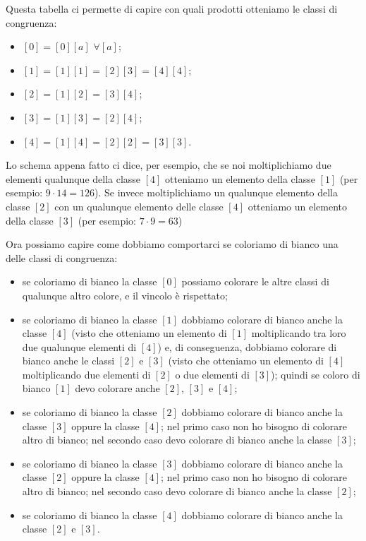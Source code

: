 \begin{soluzione}
    Questa tabella ci permette di capire con quali prodotti otteniamo le classi di congruenza:
    \begin{itemize}
        \item $[0] = [0][a] \,\,\forall [a]$;
        \item $[1] = [1][1] = [2][3] = [4][4]$;
        \item $[2] = [1][2] = [3][4]$;
        \item $[3] = [1][3] = [2][4]$;
        \item $[4] = [1][4] = [2][2] = [3][3]$.
    \end{itemize}

    Lo schema appena fatto ci dice, per esempio, che se noi moltiplichiamo due elementi qualunque della classe $[4]$
    otteniamo un elemento della classe $[1]$ (per esempio: $9 \cdot 14 = 126$).
    Se invece moltiplichiamo un qualunque elemento della classe $[2]$ con un qualunque elemento delle classe $[4]$
    otteniamo un elemento della classe $[3]$ (per esempio: $7 \cdot 9 = 63$)

    Ora possiamo capire come dobbiamo comportarci se coloriamo di bianco una delle classi di congruenza:
    \begin{itemize}
        \item se coloriamo di bianco la classe $[0]$ possiamo colorare le altre classi di qualunque altro colore,
        e il vincolo è rispettato;
        \item se coloriamo di bianco la classe $[1]$ dobbiamo colorare di bianco anche la classe $[4]$ (visto che otteniamo un
        elemento di $[1]$ moltiplicando tra loro due qualunque elementi di $[4]$) e, di conseguenza, dobbiamo colorare
        di bianco anche le classi $[2]$ e $[3]$ (visto che otteniamo un elemento di $[4]$ moltiplicando due elementi di
        $[2]$ o due elementi di $[3]$); quindi se coloro di bianco $[1]$ devo colorare anche $[2]$, $[3]$ e $[4]$;
        \item se coloriamo di bianco la classe $[2]$ dobbiamo colorare di bianco anche la classe $[3]$ oppure la classe
        $[4]$; nel primo caso non ho bisogno di colorare altro di bianco;
        nel secondo caso devo colorare di bianco anche la classe $[3]$;
        \item se coloriamo di bianco la classe $[3]$ dobbiamo colorare di bianco anche la classe $[2]$ oppure la classe
        $[4]$; nel primo caso non ho bisogno di colorare altro di bianco;
        nel secondo caso devo colorare di bianco anche la classe $[2]$;
        \item se coloriamo di bianco la classe $[4]$ dobbiamo colorare di bianco anche la classe $[2]$ e $[3]$.
    \end{itemize}


\end{soluzione}
